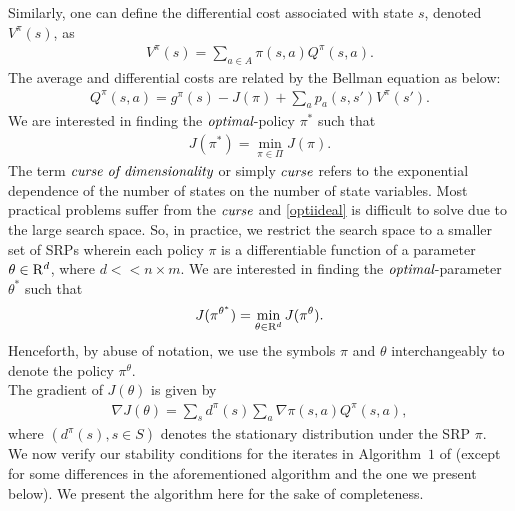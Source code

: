 Similarly, one can define the differential cost associated with state $s$, denoted $V^\pi(s)$, as
\begin{align}
V^\pi(s)=\sum_{a \in A} \pi(s,a)Q^\pi(s,a).
\end{align}
The average and differential costs are related by the Bellman equation as below:
\begin{align}
Q^\pi(s,a)=g^\pi(s)-J(\pi)+\sum_a p_a(s,s') V^\pi(s').
\end{align}
We are interested in finding the $\emph{optimal}$-policy $\pi^*$ such that 
\begin{align}\label{optiideal}
J(\pi^*)=\min_{\pi \in \Pi} J(\pi).
\end{align}
\indent The term $\emph{curse of dimensionality}$ or simply $\emph{curse}$ refers to the exponential 
dependence of the number of states on the number of state variables. Most practical problems suffer 
from the $\emph{curse}$ and \eqref{optiideal} is difficult to solve due to the large search space. So, 
in practice,  we restrict the search space to a smaller set of SRPs wherein each policy $\pi$ is a 
differentiable function of a parameter $\theta \in \mathrm{R}^d$, where $d<<n \times m$. We are interested in 
finding the $\emph{optimal}$-parameter $\theta^*$ such that 
\begin{align}\label{opti}
J(\pi^{\theta^*})=\min_{\theta \in \mathrm{R}^d} J(\pi^\theta).
\end{align}
Henceforth, by abuse of notation, we use the symbols $\pi$ and $\theta$ interchangeably to denote the 
policy $\pi^\theta$.\\
\indent The gradient of $J(\theta)$ is given by
\begin{align}
\nabla J(\theta)= \sum_s d^\pi(s) \sum_a \nabla \pi(s,a) Q^\pi(s,a),
\end{align} 
where $(d^\pi(s),s \in S)$ denotes the stationary distribution under the SRP $\pi$.\\
We now verify our stability conditions for the iterates in Algorithm~$1$ of \cite{NAC} (except for some differences in the aforementioned algorithm and the one we present below). We present the algorithm here for the sake of completeness. 
\FloatBarrier
